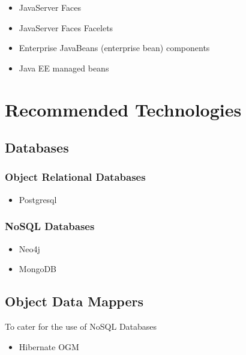 \begin{itemize}
	\item JavaServer Faces
\end{itemize}

\begin{itemize}
	\item JavaServer Faces Facelets
\end{itemize}

\begin{itemize}
	\item Enterprise JavaBeans (enterprise bean) components
\end{itemize}

\begin{itemize}
	\item Java EE managed beans
\end{itemize}


\section{Recommended Technologies}
\subsection{Databases}
\subsubsection{Object Relational Databases}
\begin{itemize}
	\item Postgresql
\end{itemize}

\subsubsection{NoSQL Databases}
\begin{itemize}
	\item Neo4j
	\item MongoDB
\end{itemize}

\subsection{Object Data Mappers}
To cater for the use of NoSQL Databases
\begin{itemize}
	\item Hibernate OGM
\end{itemize}
